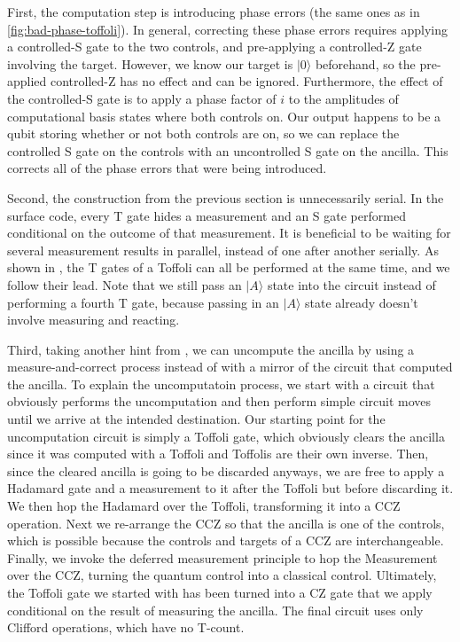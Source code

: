\documentclass[twocolumn,longbibliography]{quantumarticle-customized}
\begin{document}
First, the computation step is introducing phase errors (the same ones as in \autoref{fig:bad-phase-toffoli}).
In general, correcting these phase errors requires applying a controlled-S gate to the two controls, and pre-applying a controlled-Z gate involving the target.
However, we know our target is $|0\rangle$ beforehand, so the pre-applied controlled-Z has no effect and can be ignored.
Furthermore, the effect of the controlled-S gate is to apply a phase factor of $i$ to the amplitudes of computational basis states where both controls on.
Our output happens to be a qubit storing whether or not both controls are on, so we can replace the controlled S gate on the controls with an uncontrolled S gate on the ancilla.
This corrects all of the phase errors that were being introduced.

Second, the construction from the previous section is unnecessarily serial.
In the surface code, every T gate hides a measurement and an S gate performed conditional on the outcome of that measurement.
It is beneficial to be waiting for several measurement results in parallel, instead of one after another serially.
As shown in \cite{Jones2013}, the T gates of a Toffoli can all be performed at the same time, and we follow their lead.
Note that we still pass an $|A\rangle$ state into the circuit instead of performing a fourth T gate, because passing in an $|A\rangle$ state already doesn't involve measuring and reacting.

Third, taking another hint from \cite{Jones2013}, we can uncompute the ancilla by using a measure-and-correct process instead of with a mirror of the circuit that computed the ancilla.
To explain the uncomputatoin process, we start with a circuit that obviously performs the uncomputation and then perform simple circuit moves until we arrive at the intended destination.
Our starting point for the uncomputation circuit is simply a Toffoli gate, which obviously clears the ancilla since it was computed with a Toffoli and Toffolis are their own inverse.
Then, since the cleared ancilla is going to be discarded anyways, we are free to apply a Hadamard gate and a measurement to it after the Toffoli but before discarding it.
We then hop the Hadamard over the Toffoli, transforming it into a CCZ operation.
Next we re-arrange the CCZ so that the ancilla is one of the controls, which is possible because the controls and targets of a CCZ are interchangeable.
Finally, we invoke the deferred measurement principle \cite{Nielsen2009} to hop the Measurement over the CCZ, turning the quantum control into a classical control.
Ultimately, the Toffoli gate we started with has been turned into a CZ gate that we apply conditional on the result of measuring the ancilla.
The final circuit uses only Clifford operations, which have no T-count.
\end{document}
